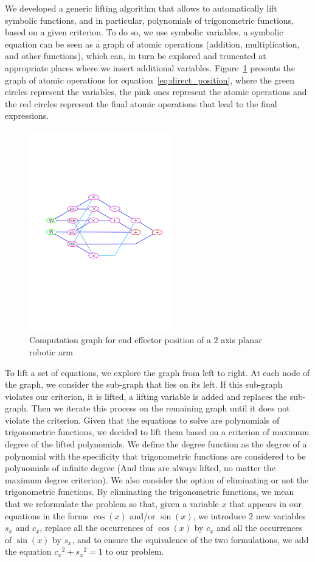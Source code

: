 We developed a generic lifting algorithm that allows to automatically lift symbolic functions, and in particular, polynomials of trigonometric functions, based on a given criterion.
To do so, we use symbolic variables, a symbolic equation can be seen as a graph of atomic operations (addition, multiplication, and other functions), which can, in turn be explored and truncated at appropriate places where we insert additional variables.
Figure~\ref{fig:graph_direct} presents the graph of atomic operations for equation~\ref{eq:direct_position}, where the green circles represent the variables, the pink ones represent the atomic operations and the red circles represent the final atomic operations that lead to the final expressions.
\begin{figure}
  \centering
  \includegraphics[width=0.55\textwidth]{graphDirectEEPos.pdf}
  \caption{Computation graph for end effector position of a 2 axis planar robotic arm}
\label{fig:graph_direct}
\end{figure}

To lift a set of equations, we explore the graph from left to right. At each node of the graph, we consider the sub-graph that lies on its left.
If this sub-graph violates our criterion, it is lifted, a lifting variable is added and replaces the sub-graph.
Then we iterate this process on the remaining graph until it does not violate the criterion.
Given that the equations to solve are polynomials of trigonometric functions, we decided to lift them based on a criterion of maximum degree of the lifted polynomials.
We define the degree function as the degree of a polynomial with the specificity that trigonometric functions are considered to be polynomials of infinite degree (And thus are always lifted, no matter the maximum degree criterion).
We also consider the option of eliminating or not the trigonometric functions.
By eliminating the trigonometric functions, we mean that we reformulate the problem so that, given a variable $x$ that appears in our equations in the forms $\cos(x)$ and/or $\sin(x)$, we introduce 2 new variables $s_x$ and $c_x$, replace all the occurrences of $\cos(x)$ by $c_x$ and all the occurrences of $\sin(x)$ by $s_x$, and to ensure the equivalence of the two formulations, we add the equation ${c_x}^2 + {s_x}^2=1$ to our problem.

